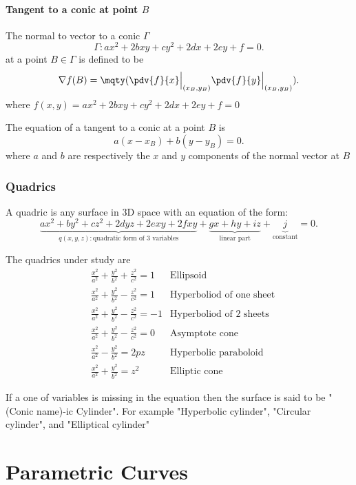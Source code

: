 \documentclass[a4paper,12pt]{article}
\begin{document}
\subsection{Tangent to a conic at point $B$ }
\begin{theorem}
	The normal to vector to a conic $\Gamma$
	\[
		\Gamma: ax^2+2bxy+cy^2+2dx+2ey+f=0
		.\]
	at a point $B\in\Gamma$ is defined to be
	\[
		\nabla  f(B) = \mqty(\pdv{f}{x} \Big|_{(x_B,y_B)}\\\pdv{f}{y} \Big|_{(x_B,y_B)})
		.\]
	where $f(x,y)=ax^2+2bxy+cy^2+2dx+2ey+f=0
	$
\end{theorem}

The equation of a tangent to a conic at a point $B$ is
\[
	a(x-x_B)+b(y-y_B)=0
	.\]
where $a$ and $b$ are respectively the $x$ and $y$ components of the normal vector at $B$


\section{Quadrics}

\begin{definition}
	A quadric is any surface in 3D space with an equation of the form:
	\[
		\underbrace{ax^2+by^2+cz^2+2dyz+2exy+2fxy}_{q(x,y,z):\text{quadratic form of 3 variables}}+\underbrace{gx+hy+iz}_{\text{linear part}}+\underbrace{j}_{\text{constant}}=0
		.\]
\end{definition}
The quadrics under study are
\begin{align*}
	 & \frac{x^2}{a^2}+\frac{y^2}{b^2}+\frac{z^2}{c^2}=1   & \text{Ellipsoid}                \\
	 & \frac{x^2}{a^2}+\frac{y^2}{b^2}-\frac{z^2}{c^2}=1   & \text{Hyperboliod of one sheet} \\
	 & \frac{x^2}{a^2} +\frac{y^2}{b^2}-\frac{z^2}{c^2}=-1 & \text{Hyperboliod of 2 sheets}  \\
	 & \frac{x^2}{a^2}+\frac{y^2}{b^2}-\frac{z^2}{c^2}=0   & \text{Asymptote cone}           \\
	 & \frac{x^2}{a^2}-\frac{y^2}{b^2}=2pz                 & \text{Hyperbolic paraboloid}    \\
	 & \frac{x^2}{a^2}+\frac{y^2}{b^2}=z^2                 & \text{Elliptic cone}
\end{align*}

If a one of variables is missing in the equation then the surface is said to be "(Conic name)-ic Cylinder". For example "Hyperbolic cylinder", "Circular cylinder", and "Elliptical cylinder"

\part{Parametric Curves}
\end{document}
